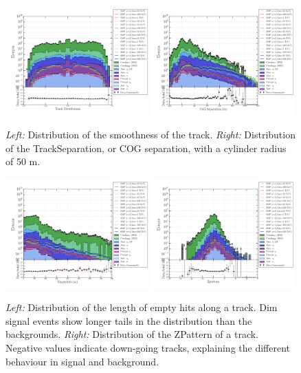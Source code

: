 \begin{figure}
\centering
\includegraphics[width = 0.49\textwidth]{chapter8/img/1D_stack_trackdistribution_50.png}
\includegraphics[width = 0.49\textwidth]{chapter8/img/1D_stack_trackseparation_50.png}
\caption{\textit{Left: }Distribution of the smoothness of the track. \textit{Right: }Distribution of the TrackSeparation, or COG separation, with a cylinder radius of 50 m.}
\label{fig:commonvariables3}
\end{figure}

\begin{figure}
\centering
\includegraphics[width = 0.49\textwidth]{chapter8/img/1D_stack_emptyhits_100.png}
\includegraphics[width = 0.49\textwidth]{chapter8/img/1D_stack_zpattern.png}
\caption{\textit{Left: }Distribution of the length of empty hits along a track. Dim signal events show longer tails in the distribution than the backgrounds. \textit{Right: }Distribution of the ZPattern of a track. Negative values indicate down-going tracks, explaining the different behaviour in signal and background.}
\label{fig:commonvariables4}
\end{figure}

